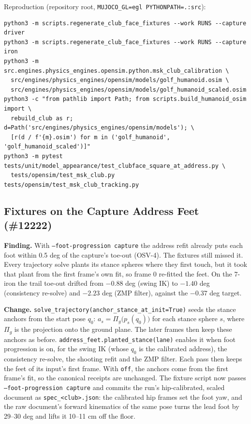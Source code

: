 \documentclass[11pt,a4paper]{article}
\begin{document}
Reproduction (repository root, \texttt{MUJOCO\_GL=egl PYTHONPATH=.:src}):
\begin{verbatim}
python3 -m scripts.regenerate_club_face_fixtures --work RUNS --capture driver
python3 -m scripts.regenerate_club_face_fixtures --work RUNS --capture iron
python3 -m src.engines.physics_engines.opensim.python.msk_club_calibration \
  src/engines/physics_engines/opensim/models/golf_humanoid.osim \
  src/engines/physics_engines/opensim/models/golf_humanoid_scaled.osim
python3 -c "from pathlib import Path; from scripts.build_humanoid_osim import \
  rebuild_club as r; d=Path('src/engines/physics_engines/opensim/models'); \
  [r(d / f'{m}.osim') for m in ('golf_humanoid', 'golf_humanoid_scaled')]"
python3 -m pytest tests/unit/model_appearance/test_clubface_square_at_address.py \
  tests/opensim/test_msk_club.py tests/opensim/test_msk_club_tracking.py
\end{verbatim}

\subsection{Fixtures on the Capture Address Feet (\#12222)}
\textbf{Finding.} With \texttt{--foot-progression capture} the address refit
already puts each foot within 0.5 deg of the capture's toe-out (OSV-4). The
fixtures still missed it. Every trajectory solve plants its stance spheres
where they first touch, but it took that plant from the first frame's own
fit, so frame 0 re-fitted the feet. On the 7-iron the trail toe-out drifted
from $-0.88$ deg (swing IK) to $-1.40$ deg (consistency re-solve) and
$-2.23$ deg (ZMP filter), against the $-0.37$ deg target.

\textbf{Change.} \texttt{solve\_trajectory(anchor\_stance\_at\_init=True)}
seeds the stance anchors from the start pose $q_0$:
$a_s = \Pi_g\big(p_s(q_0)\big)$ for each stance sphere $s$, where $\Pi_g$ is
the projection onto the ground plane. The later frames then keep these
anchors as before. \texttt{address\_feet.planted\_stance(lane)} enables it
when foot progression is on, for the swing IK (whose $q_0$ is the calibrated
address), the consistency re-solve, the shooting refit and the ZMP filter.
Each pass then keeps the feet of its input's first frame. With
\texttt{off}, the anchors come from the first frame's fit, so the canonical
receipts are unchanged. The fixture script now passes
\texttt{--foot-progression capture} and commits the run's hip-calibrated,
scaled document as \texttt{spec\_<club>.json}: the calibrated hip frames set
the foot yaw, and the raw document's forward kinematics of the same pose
turns the lead foot by 29--30 deg and lifts it 10--11 cm off the floor.
\end{document}
